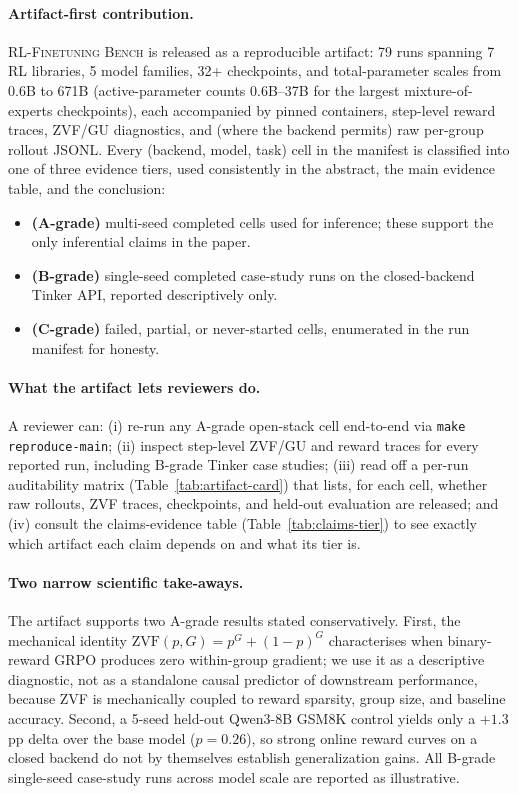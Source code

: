 \documentclass{article}
\newcommand{\ours}{\textsc{RL-Finetuning Bench}}
\begin{document}
\paragraph{Artifact-first contribution.}
\ours{} is released as a reproducible artifact: 79 runs spanning 7 RL
libraries, 5 model families, 32+ checkpoints, and total-parameter scales
from 0.6B to 671B (active-parameter counts 0.6B--37B for the largest
mixture-of-experts checkpoints), each accompanied by pinned containers,
step-level reward traces, ZVF/GU diagnostics, and (where the backend
permits) raw per-group rollout JSONL. Every (backend, model, task) cell
in the manifest is classified into one of three evidence tiers, used
consistently in the abstract, the main evidence table, and the
conclusion:
\begin{itemize}\setlength\itemsep{1pt}
  \item \textbf{(A-grade)} multi-seed completed cells used for inference;
        these support the only inferential claims in the paper.
  \item \textbf{(B-grade)} single-seed completed case-study runs on the
        closed-backend Tinker API, reported descriptively only.
  \item \textbf{(C-grade)} failed, partial, or never-started cells,
        enumerated in the run manifest for honesty.
\end{itemize}

\paragraph{What the artifact lets reviewers do.}
A reviewer can: (i) re-run any A-grade open-stack cell end-to-end via
\texttt{make reproduce-main}; (ii) inspect step-level ZVF/GU and reward
traces for every reported run, including B-grade Tinker case studies;
(iii) read off a per-run auditability matrix (Table~\ref{tab:artifact-card})
that lists, for each cell, whether raw rollouts, ZVF traces, checkpoints,
and held-out evaluation are released; and (iv) consult the claims-evidence
table (Table~\ref{tab:claims-tier}) to see exactly which artifact each
claim depends on and what its tier is.

\paragraph{Two narrow scientific take-aways.}
The artifact supports two A-grade results stated conservatively. First, the
mechanical identity $\mathrm{ZVF}(p, G) = p^{G} + (1{-}p)^{G}$ characterises
when binary-reward GRPO produces zero within-group gradient; we use it as
a descriptive diagnostic, not as a standalone causal predictor of
downstream performance, because ZVF is mechanically coupled to reward
sparsity, group size, and baseline accuracy. Second, a 5-seed held-out
Qwen3-8B GSM8K control yields only a $+1.3$pp delta over the base model
($p{=}0.26$), so strong online reward curves on a closed backend do not by
themselves establish generalization gains. All B-grade single-seed
case-study runs across model scale are reported as illustrative.
\end{document}
